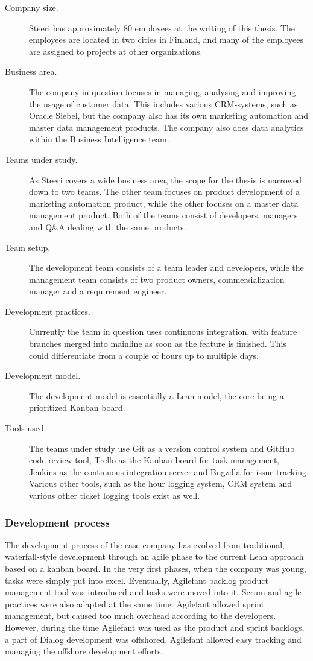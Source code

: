 \documentclass[english]{tktltiki2}
\theoremstyle{definition}
\theoremstyle{remark}
\begin{document}
\begin{description}
  \item[Company size.] Steeri has approximately 80 employees at the writing of this thesis. The employees are located in two cities in Finland, and many of the employees are assigned to projects at other organizations.
  \item[Business area.] The company in question focuses in managing, analysing and improving the usage of customer data. This includes various CRM-systems, such as Oracle Siebel, but the company also has its own marketing automation and master data management products. The company also does data analytics within the Business Intelligence team.
  \item[Teams under study.] As Steeri covers a wide business area, the scope for the thesis is narrowed down to two teams. The other team focuses on product development of a marketing automation product, while the other focuses on a master data management product. Both of the teams consist of developers, managers and Q\&A dealing with the same products.
  \item[Team setup.] The development team consists of a team leader and developers, while the management team consists of two product owners, commersialization manager and a requirement engineer. 
  \item[Development practices.] Currently the team in question uses continuous integration, with feature branches merged into mainline as soon as the feature is finished. This could differentiate from a couple of hours up to multiple days.
  \item[Development model.] The development model is essentially a Lean model, the core being a prioritized Kanban board.  
  \item[Tools used.] The teams under study use Git as a version control system and GitHub code review tool, Trello as the Kanban board for task management, Jenkins as the continuous integration server and Bugzilla for issue tracking. Various other tools, such as the hour logging system, CRM system and various other ticket logging tools exist as well.  
\end{description}

\subsubsection{Development process}
The development process of the case company has evolved from traditional, waterfall-style development through an agile phase to the current Lean approach based on a kanban board. In the very first phases, when the company was young, tasks were simply put into excel. Eventually, Agilefant backlog product management tool was introduced and tasks were moved into it. Scrum and agile practices were also adapted at the same time. Agilefant allowed sprint management, but caused too much overhead according to the developers. However, during the time Agilefant was used as the product and sprint backlogs, a part of Dialog development was offshored. Agilefant allowed easy tracking and managing the offshore development efforts.
\end{document}
